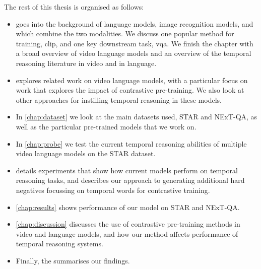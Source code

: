 The rest of this thesis is organised as follows:

\begin{itemize}
	\item {} goes into the background of language models, image
		recognition models, and  which combine the two
		modalities. We discuss one popular method for training, \Acrfull{clip},
		and one key downstream task, \acrlong{vqa}. We finish the chapter with
		a broad overview of video language models and an overview of the
		temporal reasoning literature in video and in language.
	\item {} explores related work on video language models,
		with a particular focus on work that explores the impact of contrastive
		pre-training. We also look at other approaches for instilling temporal
		reasoning in these models.
	\item In \cref{chap:dataset} we look at the main datasets used, STAR and
		NExT-QA, as well as the particular pre-trained models that we work on.
	\item In \cref{chap:probe} we test the current temporal reasoning abilities
		of multiple video language models on the STAR dataset.
	\item {} details experiments that show how current
		models perform on temporal reasoning tasks, and describes our approach
		to generating additional hard negatives focussing on temporal words for
		contrastive training.
	\item \cref{chap:results} shows performance of our model on STAR and NExT-QA.
	\item \cref{chap:discussion} discusses the use of contrastive
		pre-training methods in video and language models, and how our method
		affects performance of temporal reasoning systems.
	\item Finally, the  summarises our findings.
\end{itemize}

